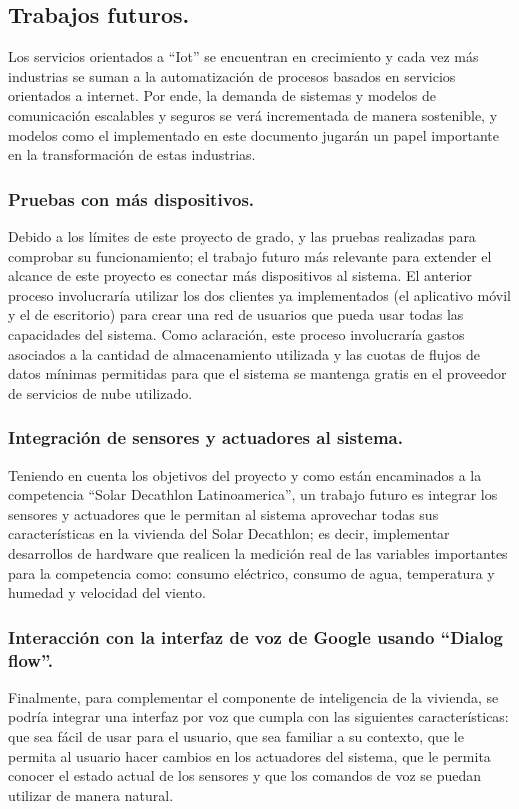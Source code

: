 \subsection{Trabajos futuros.}

Los servicios orientados a ``Iot'' se encuentran en crecimiento y cada vez más industrias se suman a la automatización de procesos basados en servicios orientados a internet. Por ende, la demanda de sistemas y modelos de comunicación escalables y seguros se verá incrementada de manera sostenible, y modelos como el implementado en este documento jugarán un papel importante en la transformación de estas industrias.

\subsubsection {Pruebas con más dispositivos.}
Debido a los límites de este proyecto de grado, y las pruebas realizadas para comprobar su funcionamiento; el trabajo futuro más relevante para extender el alcance de este proyecto es conectar más dispositivos al sistema. El anterior proceso involucraría utilizar los dos clientes ya implementados (el aplicativo móvil y el de escritorio) para crear una red de usuarios que pueda usar todas las capacidades del sistema. Como aclaración, este proceso involucraría gastos asociados a la cantidad de almacenamiento utilizada y las cuotas de flujos de datos mínimas permitidas para que el sistema se mantenga gratis en el proveedor de servicios de nube utilizado.


\subsubsection {Integración de sensores y actuadores al sistema.}
Teniendo en cuenta los objetivos del proyecto y como están encaminados a la competencia “Solar Decathlon Latinoamerica”, un trabajo futuro es integrar los sensores y actuadores que le permitan al sistema aprovechar todas sus características en la vivienda del Solar Decathlon; es decir, implementar desarrollos de hardware que realicen la medición real de las variables importantes para la competencia como: consumo eléctrico, consumo de agua, temperatura y humedad y velocidad del viento.

\subsubsection  {Interacción con la interfaz de voz de Google usando ``Dialog flow''.}
Finalmente, para complementar el componente de inteligencia de la vivienda, se podría integrar una interfaz por voz que cumpla con las siguientes características: que sea fácil de usar para el usuario, que sea familiar a su contexto, que le permita al usuario hacer cambios en los actuadores del sistema, que le permita conocer el estado actual de los sensores y que los comandos de voz se puedan utilizar de manera natural.


